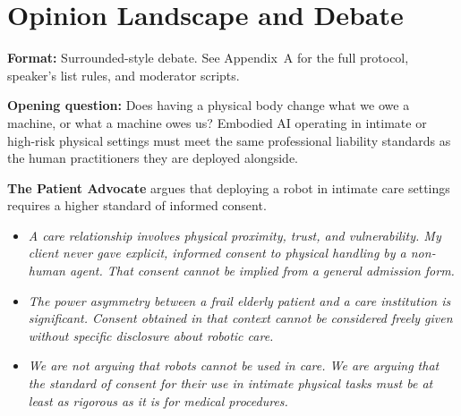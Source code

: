 \section*{Opinion Landscape and Debate}

\noindent \textbf{Format:} Surrounded-style debate. See
Appendix~A for the full protocol, speaker's list rules, and
moderator scripts.

\medskip
\noindent \textbf{Opening question:} Does having a physical body change
what we owe a machine, or what a machine owes us?
\quad Embodied AI operating in
intimate or high-risk physical settings must meet the same professional
liability standards as the human practitioners they are deployed alongside.
\vspace{1.5em}


\medskip
\noindent\textbf{The Patient Advocate} argues that deploying a robot in intimate
    care settings requires a higher standard of informed consent.
    \begin{itemize}
        \item \textit{A care relationship involves physical proximity, trust,
        and vulnerability. My client never gave explicit, informed consent to
        physical handling by a non-human agent. That consent cannot be
        implied from a general admission form.}
        \item \textit{The power asymmetry between a frail elderly patient
        and a care institution is significant. Consent obtained in that
        context cannot be considered freely given without specific disclosure
        about robotic care.}
        \item \textit{We are not arguing that robots cannot be used in care.
        We are arguing that the standard of consent for their use in intimate
        physical tasks must be at least as rigorous as it is for medical
        procedures.}
    \end{itemize}

